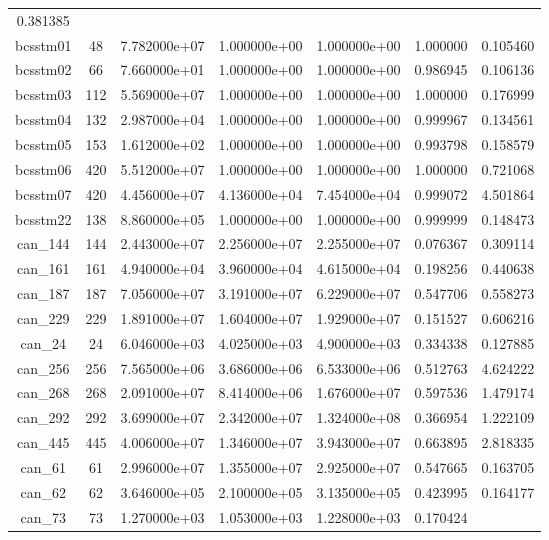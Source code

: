 \begin{table}[h]
\begin{tabular}{ccccccc}
    0.381385\\
    bcsstm01 & 48 & 7.782000e+07 & 1.000000e+00 & 1.000000e+00 & 1.000000 &
    0.105460\\
    bcsstm02 & 66 & 7.660000e+01 & 1.000000e+00 & 1.000000e+00 & 0.986945 &
    0.106136\\
    bcsstm03 & 112 & 5.569000e+07 & 1.000000e+00 & 1.000000e+00 & 1.000000 &
    0.176999\\
    bcsstm04 & 132 & 2.987000e+04 & 1.000000e+00 & 1.000000e+00 & 0.999967 &
    0.134561\\
    bcsstm05 & 153 & 1.612000e+02 & 1.000000e+00 & 1.000000e+00 & 0.993798 &
    0.158579\\
    bcsstm06 & 420 & 5.512000e+07 & 1.000000e+00 & 1.000000e+00 & 1.000000 &
    0.721068\\
    bcsstm07 & 420 & 4.456000e+07 & 4.136000e+04 & 7.454000e+04 & 0.999072 &
    4.501864\\
    bcsstm22 & 138 & 8.860000e+05 & 1.000000e+00 & 1.000000e+00 & 0.999999 &
    0.148473\\
    can\_144 & 144 & 2.443000e+07 & 2.256000e+07 & 2.255000e+07 & 0.076367 &
    0.309114\\
    can\_161 & 161 & 4.940000e+04 & 3.960000e+04 & 4.615000e+04 & 0.198256 &
    0.440638\\
    can\_187 & 187 & 7.056000e+07 & 3.191000e+07 & 6.229000e+07 & 0.547706 &
    0.558273\\
    can\_229 & 229 & 1.891000e+07 & 1.604000e+07 & 1.929000e+07 & 0.151527 &
    0.606216\\
    can\_24 & 24 & 6.046000e+03 & 4.025000e+03 & 4.900000e+03 & 0.334338 &
    0.127885\\
    can\_256 & 256 & 7.565000e+06 & 3.686000e+06 & 6.533000e+06 & 0.512763 &
    4.624222\\
    can\_268 & 268 & 2.091000e+07 & 8.414000e+06 & 1.676000e+07 & 0.597536 &
    1.479174\\
    can\_292 & 292 & 3.699000e+07 & 2.342000e+07 & 1.324000e+08 & 0.366954 &
    1.222109\\
    can\_445 & 445 & 4.006000e+07 & 1.346000e+07 & 3.943000e+07 & 0.663895 &
    2.818335\\
    can\_61 & 61 & 2.996000e+07 & 1.355000e+07 & 2.925000e+07 & 0.547665 &
    0.163705\\
    can\_62 & 62 & 3.646000e+05 & 2.100000e+05 & 3.135000e+05 & 0.423995 &
    0.164177\\
    can\_73 & 73 & 1.270000e+03 & 1.053000e+03 & 1.228000e+03 & 0.170424 &

\end{tabular}
\end{table}
